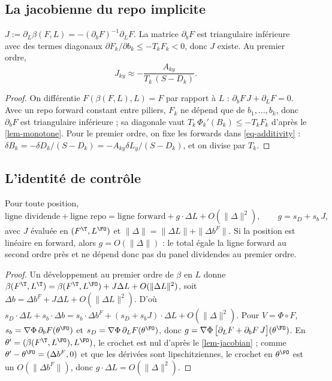 \subsection{La jacobienne du repo implicite}
\begin{lemma}\label{lem-jacobian}
$J:=\partial_L\beta(F,L)=-(\partial_bF)^{-1}\partial_LF$. La matrice $\partial_bF$ est triangulaire inférieure avec des
termes diagonaux $\partial F_k/\partial b_k\le-T_kF_k<0$, donc $J$ existe. Au premier ordre,
\begin{equation}\label{eq-jacobian}
J_{ky}\approx-\frac{A_{ky}}{T_k\,(S-D_k)}.
\end{equation}
\end{lemma}
\begin{proof}
On différentie $F(\beta(F,L),L)=F$ par rapport à $L$ : $\partial_bF\,J+\partial_LF=0$. Avec un repo forward constant
entre piliers, $F_k$ ne dépend que de $b_1,\dots,b_k$, donc $\partial_bF$ est triangulaire inférieure ; sa diagonale vaut
$T_k\,\Phi_k'(B_k)\le-T_kF_k$ d'après le \cref{lem-monotone}. Pour le premier ordre, on fixe les forwards dans
\cref{eq-additivity} : $\delta B_k=-\delta D_k/(S-D_k)=-A_{ky}\delta L_y/(S-D_k)$, et on divise par $T_k$.
\end{proof}

\subsection{L'identité de contrôle}
\begin{theorem}\label{thm-control}
Pour toute position,
\begin{equation}\label{eq-control}
\text{ligne dividende}+\text{ligne repo}=\text{ligne forward}+g\cdot\Delta L+O(\|\Delta\|^2),\qquad g=s_D+s_b\,J,
\end{equation}
avec $J$ évaluée en $(F^\T,L^\FO)$ et $\|\Delta\|=\|\Delta L\|+\|\Delta b^F\|$. Si la position est linéaire en forward,
alors $g=O(\|\Delta\|)$ : le total égale la ligne forward au second ordre près et ne dépend donc pas du panel
dividendes au premier ordre.
\end{theorem}
\begin{proof}
Un développement au premier ordre de $\beta$ en $L$ donne $\beta(F^\T,L^\T)=\beta(F^\T,L^\FO)+J\Delta L+O(\|\Delta L\|^2)$,
soit $\Delta b=\Delta b^F+J\Delta L+O(\|\Delta L\|^2)$. D'où
$s_D\cdot\Delta L+s_b\cdot\Delta b=s_b\cdot\Delta b^F+(s_D+s_bJ)\cdot\Delta L+O(\|\Delta\|^2)$.
Pour $V=\Phi\circ F$, $s_b=\nabla\Phi\,\partial_bF(\theta^\FO)$ et $s_D=\nabla\Phi\,\partial_LF(\theta^\FO)$, donc
$g=\nabla\Phi\,\bigl[\partial_LF+\partial_bF\,J\bigr](\theta^\FO)$. En $\theta'=(\beta(F^\T,L^\FO),L^\FO)$, le crochet est nul
d'après le \cref{lem-jacobian} ; comme $\theta'-\theta^\FO=(\Delta b^F,0)$ et que les dérivées sont lipschitziennes, le
crochet en $\theta^\FO$ est un $O(\|\Delta b^F\|)$, donc $g\cdot\Delta L=O(\|\Delta\|^2)$.
\end{proof}

